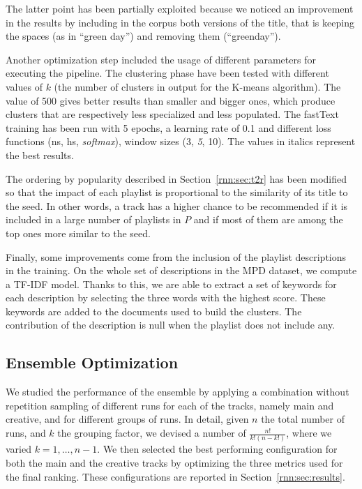 The latter point has been partially exploited because we noticed an improvement in the results by including in the corpus both versions of the title, that is keeping the spaces (as in ``green day'') and removing them (``greenday'').

Another optimization step included the usage of different parameters for executing the pipeline. The clustering phase have been tested with different values of $k$ (the number of clusters in output for the K-means algorithm). The value of 500 gives better results than smaller and bigger ones, which produce clusters that are respectively less specialized and less populated. The fastText training has been run with 5 epochs, a learning rate of 0.1 and different loss functions (ns, hs, \textit{softmax}), window sizes (3, \textit{5}, 10). The values in italics represent the best results.

The ordering by popularity described in Section~\ref{rnn:sec:t2r} has been modified so that the impact of each playlist is proportional to the similarity of its title to the seed. In other words, a track has a higher chance to be recommended if it is included in a large number of playlists in $P$ and if most of them are among the top ones more similar to the seed.

Finally, some improvements come from the inclusion of the playlist descriptions in the training. On the whole set of descriptions in the MPD dataset, we compute a TF-IDF model. Thanks to this, we are able to extract a set of keywords for each description by selecting the three words with the highest score. These keywords are added to the documents used to build the clusters. The contribution of the description is null when the playlist does not include any.

\subsection{Ensemble Optimization}

We studied the performance of the ensemble by applying a combination without repetition sampling of different runs for each of the tracks, namely main and creative, and for different groups of runs. In detail, given $n$ the total number of runs, and $k$ the grouping factor, we devised a number of $\frac{n!}{k!(n-k!)}$, where we varied $k=1,\dots,n-1$. We then selected the best performing configuration for both the main and the creative tracks by optimizing the three metrics used for the final ranking. These configurations are reported in Section~\ref{rnn:sec:results}.

